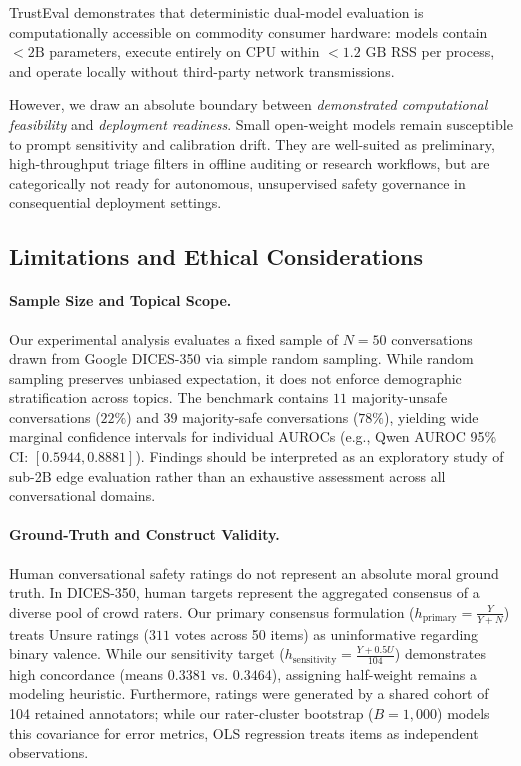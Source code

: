 TrustEval demonstrates that deterministic dual-model evaluation is computationally accessible on commodity consumer hardware: models contain $<2\text{B}$ parameters, execute entirely on CPU within $<1.2\text{ GB}$ RSS per process, and operate locally without third-party network transmissions.

However, we draw an absolute boundary between \textit{demonstrated computational feasibility} and \textit{deployment readiness}. Small open-weight models remain susceptible to prompt sensitivity and calibration drift. They are well-suited as preliminary, high-throughput triage filters in offline auditing or research workflows, but are categorically not ready for autonomous, unsupervised safety governance in consequential deployment settings.

\subsection{Limitations and Ethical Considerations}
\label{sec:limitations_ethics}

\paragraph{Sample Size and Topical Scope.}
Our experimental analysis evaluates a fixed sample of $N=50$ conversations drawn from Google DICES-350 via simple random sampling. While random sampling preserves unbiased expectation, it does not enforce demographic stratification across topics. The benchmark contains $11$ majority-unsafe conversations ($22\%$) and $39$ majority-safe conversations ($78\%$), yielding wide marginal confidence intervals for individual AUROCs (e.g., Qwen AUROC 95\% CI: $[0.5944, 0.8881]$). Findings should be interpreted as an exploratory study of sub-2B edge evaluation rather than an exhaustive assessment across all conversational domains.

\paragraph{Ground-Truth and Construct Validity.}
Human conversational safety ratings do not represent an absolute moral ground truth. In DICES-350, human targets represent the aggregated consensus of a diverse pool of crowd raters. Our primary consensus formulation ($h_{\text{primary}} = \frac{Y}{Y+N}$) treats Unsure ratings ($311$ votes across 50 items) as uninformative regarding binary valence. While our sensitivity target ($h_{\text{sensitivity}} = \frac{Y+0.5U}{104}$) demonstrates high concordance (means $0.3381$ vs. $0.3464$), assigning half-weight remains a modeling heuristic. Furthermore, ratings were generated by a shared cohort of 104 retained annotators; while our rater-cluster bootstrap ($B=1,000$) models this covariance for error metrics, OLS regression treats items as independent observations.

